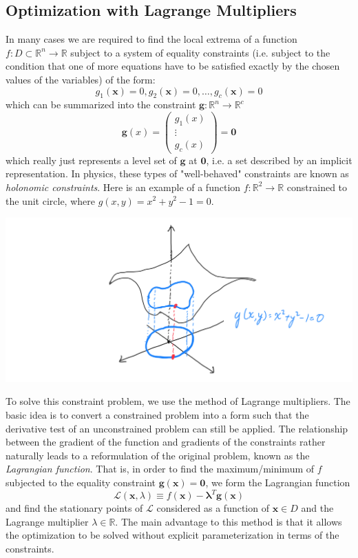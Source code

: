 \subsection{Optimization with Lagrange Multipliers} 

  In many cases we are required to find the local extrema of a function $f: D \subset \mathbb{R}^n \longrightarrow \mathbb{R}$ subject to a system of equality constraints (i.e. subject to the condition that one of more equations have to be satisfied exactly by the chosen values of the variables) of the form: 
  \[g_1 (\mathbf{x}) = 0, g_2 (\mathbf{x}) = 0, \ldots, g_c (\mathbf{x}) = 0 \]
  which can be summarized into the constraint $\mathbf{g}: \mathbb{R}^n \longrightarrow \mathbb{R}^c$
  \[\mathbf{g}(x) = \begin{pmatrix}
  g_1 (x) \\ \vdots \\ g_c (x)
  \end{pmatrix} = \mathbf{0}\]
  which really just represents a level set of $\mathbf{g}$ at $\mathbf{0}$, i.e. a set described by an implicit representation. In physics, these types of "well-behaved" constraints are known as \textit{holonomic constraints}. Here is an example of a function $f: \mathbb{R}^2 \longrightarrow \mathbb{R}$ constrained to the unit circle, where $g(x, y) = x^2 + y^2 - 1= 0 $.
  \begin{center}
      \includegraphics[scale=0.2]{img/Function_with_Constraints.PNG}
  \end{center}
  To solve this constraint problem, we use the method of Lagrange multipliers. The basic idea is to convert a constrained problem into a form such that the derivative test of an unconstrained problem can still be applied. The relationship between the gradient of the function and gradients of the constraints rather naturally leads to a reformulation of the original problem, known as the \textit{Lagrangian function}. That is, in order to find the maximum/minimum of $f$ subjected to the equality constraint $\mathbf{g}(\mathbf{x}) = \mathbf{0}$, we form the Lagrangian function
  \[\mathcal{L}(\mathbf{x}, \lambda) \equiv f(\mathbf{x}) - \boldsymbol{\lambda}^T \mathbf{g}(\mathbf{x})\]
  and find the stationary points of $\mathcal{L}$ considered as a function of $\mathbf{x} \in D$ and the Lagrange multiplier $\lambda \in \mathbb{R}$. The main advantage to this method is that it allows the optimization to be solved without explicit parameterization in terms of the constraints. 

